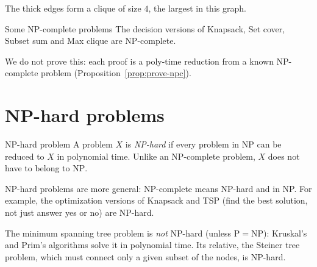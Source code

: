\documentclass[a4paper,12pt,oneside]{report}
\begin{document}
\begin{center}

{\small The thick edges form a clique of size $4$, the largest in this
graph.}
\end{center}

\begin{framedprop}{Some NP-complete problems}\label{prop:npc-examples}
The decision versions of Knapsack, Set cover, Subset sum and Max clique
are NP-complete.
\end{framedprop}

We do not prove this: each proof is a poly-time reduction from a known
NP-complete problem (Proposition~\ref{prop:prove-npc}).

\section{NP-hard problems}

\begin{frameddefn}{NP-hard problem}\label{def:np-hard}
A problem $X$ is \emph{NP-hard} if every problem in $\mathrm{NP}$ can
be reduced to $X$ in polynomial time. Unlike an NP-complete problem,
$X$ does not have to belong to $\mathrm{NP}$.
\end{frameddefn}

NP-hard problems are more general: NP-complete means NP-hard and in
NP. For example, the optimization versions of Knapsack and TSP (find
the best solution, not just answer yes or no) are NP-hard.

\begin{notebox}
The minimum spanning tree problem is \emph{not} NP-hard (unless
$\mathrm{P}=\mathrm{NP}$): Kruskal's and Prim's algorithms solve it in
polynomial time. Its relative, the Steiner tree problem, which must
connect only a given subset of the nodes, is NP-hard.
\end{notebox}
\end{document}
